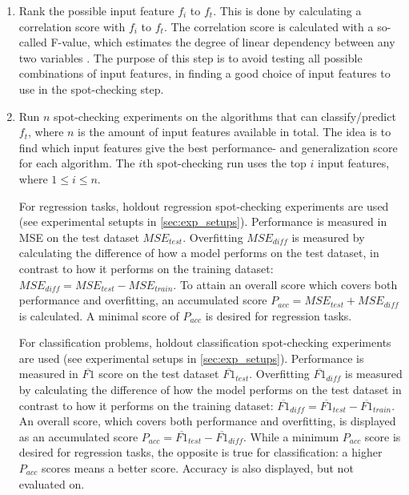 		\begin{enumerate}
			\item Rank the possible input feature $f_i$ to $f_t$. This is done by calculating a correlation score with $f_i$ to $f_t$. The correlation score is calculated with a so-called F-value, which estimates the degree of linear dependency between any two variables \cite{WEBSITE:28, WEBSITE:29}. The purpose of this step is to avoid testing all possible combinations of input features, in finding a good choice of input features to use in the spot-checking step. %

			\item Run $n$ spot-checking experiments on the algorithms that can classify/predict $f_t$, where $n$ is the amount of input features available in total. The idea is to find which input features give the best performance- and generalization score for each algorithm. The $i$th spot-checking run uses the top $i$ input features, where $1 \leq i \leq n$.

				For regression tasks, holdout regression spot-checking experiments are used (see experimental setupts in \ref{sec:exp_setups}). Performance is measured in MSE on the test dataset $MSE_{test}$. Overfitting $MSE_{diff}$ is measured by calculating the difference of how a model performs on the test dataset, in contrast to how it performs on the training dataset: $MSE_{diff} = MSE_{test} - MSE_{train}$. To attain an overall score which covers both performance and overfitting, an accumulated score $P_{acc} = MSE_{test} + MSE_{diff}$ is calculated. A minimal score of $P_{acc}$ is desired for regression tasks.

				For classification problems, holdout classification spot-checking experiments are used (see experimental setups in \ref{sec:exp_setups}). Performance is measured in $\overline{F1}$ score on the test dataset $\overline{F1}_{test}$. Overfitting $\overline{F1}_{diff}$ is measured by calculating the difference of how the model performs on the test dataset in contrast to how it performs on the training dataset: $\overline{F1}_{diff} = \overline{F1}_{test} - \overline{F1}_{train}$. An overall score, which covers both performance and overfitting, is displayed as an accumulated score $P_{acc} = \overline{F1}_{test} - \overline{F1}_{diff}$. While a minimum $P_{acc}$ score is desired for regression tasks, the opposite is true for classification: a higher $P_{acc}$ scores means a better score. Accuracy is also displayed, but not evaluated on.


\end{enumerate}
